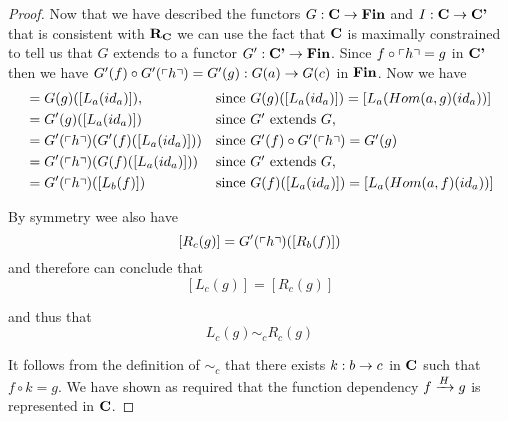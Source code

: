 \begin{proof}
Now that we have described the functors  $G: \catc \morph \Fin$ and $I:\catc \morph \catcp$ that is consistent with $\reqtc$
we can use the fact that $\catc$ is maximally constrained to tell us that $G$ extends to a functor 
$G' : \catcp \morph \Fin$. Since $f \circ \qq{h} = g$ in $\catcp$ then we have
 $G'(f) \circ G'(\qq{h}) = G'(g): G(a) \morph G(c)$ in $\Fin$.
Now we have
\begin{align*}
[L_c(g)]&= G(g)([L_a(id_a)]) ,             & & 
                              \mbox{since $G(g)([L_a(id_a)]) = [L_a(Hom(a,g)(id_a))$}] \\
        &= G'(g)([L_a(id_a)])              & & \mbox{since $G'$ extends $G$,}          \\
        &= G'(\qq{h}) (G'(f)([L_a(id_a)])) & & 
                              \mbox{since $G'(f) \circ G'(\qq{h}) = G'(g)$}  \\
        &= G'(\qq{h}) (G(f)([L_a(id_a)])) & & \mbox{since $G'$ extends $G$,}          \\ 
	&= G'(\qq{h}) ([L_b(f)])       & & 
                              \mbox{since $G(f)([L_a(id_a)]) = [L_a(Hom(a,f)(id_a))$}] \\
\end{align*}

By symmetry wee also have
$$[R_c(g)] = G'(\qq{h}) ([R_b(f)])  $$
and therefore can conclude that
$$[L_c(g)] = [R_c(g)]$$

and thus that
$$ L_c(g) \sim_c R_c(g)$$

It follows from the definition of $\sim_c$ that there exists $k:b \morph c$ in 
$\catc$ such that $f \circ k = g$.    
We have shown as required that the function dependency
$\fundep{H}{f}{g}$ is represented in $\catc$.

\end{proof}


